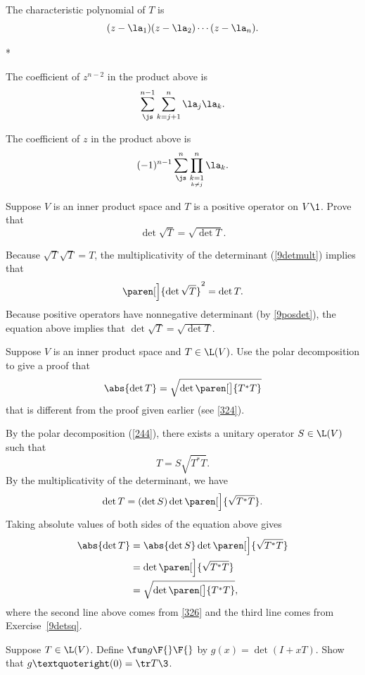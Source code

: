 \begin{Solution}
The characteristic polynomial of $T$ is
\[ \addtolength{\belowdisplayskip}{-3bp}
(z - \la_1)(z - \la_2) \dotsm (z - \la_n).
\]
\begin{subtheorem}*
\item
The coefficient of $z^{n-2}$ in the product above is
\[
\sum_{\js}^{n-1} \sum_{k = j+1}^n \la_j \la_k.
\]
\item
The coefficient of $z$ in the product above is
\[
(-1)^{n-1} \sum_{\js}^n \prod_{\underset{k \ne j}{k = 1}}^n \la_k.
\]
\end{subtheorem}
\end{Solution}

\exercise
Suppose $V$ is an inner product space and $T$ is a positive operator on $V\1$. Prove that\label{9detsq}
\[
\det \sqrt{T} = \sqrt{ \det T }.
\]
\exercisedisplayend

\begin{Solution}
Because $\sqrt{T} \sqrt{T} = T$, the multiplicativity of the determinant (\ref{9detmult}) implies that
\[
\paren[\Big]{\det \sqrt{T}}^2 = \det T.
\]
Because positive operators have nonnegative determinant (by \ref{9posdet}), the equation above implies that
$\det \sqrt{T} = \sqrt{ \det T }$.
\end{Solution}

\exercise
Suppose $V$ is an inner product space and $T \in \L(V)$. Use the polar decomposition to give a proof that
\[
\abs{\det T} = \sqrt{\det\paren[\big]{T^*T}}
\]
that is different from the proof given earlier (see \ref{324}).

\begin{Solution}
By the polar decomposition (\ref{244}),  there exists a unitary operator $S \in \L(V)$ such that
\[
T = S\sqrt{T^*T}.
\]
By the multiplicativity of the determinant, we have
\[
\det T = (\det S) \det\paren[\Big]{ \sqrt{T^*T} }.
\]
Taking absolute values of both sides of the equation above gives
\begin{align*}
\abs{\det T} &= \abs{ \det S } \det\paren[\Big]{ \sqrt{T^*T} } \\
&= \det\paren[\Big]{ \sqrt{T^*T} } \\
&= \sqrt{\det\paren[\big]{T^*T}},
\end{align*}
where the second line above comes from \ref{326} and the third line comes from Exercise~\ref{9detsq}.
\end{Solution}

\exercise
Suppose $T \in \L(V)$. Define $\fun g {\F{}} {\F{}}$ by
$
g(x) = \det(I + xT)$.
Show that $g’(0) = \tr T\3$.

